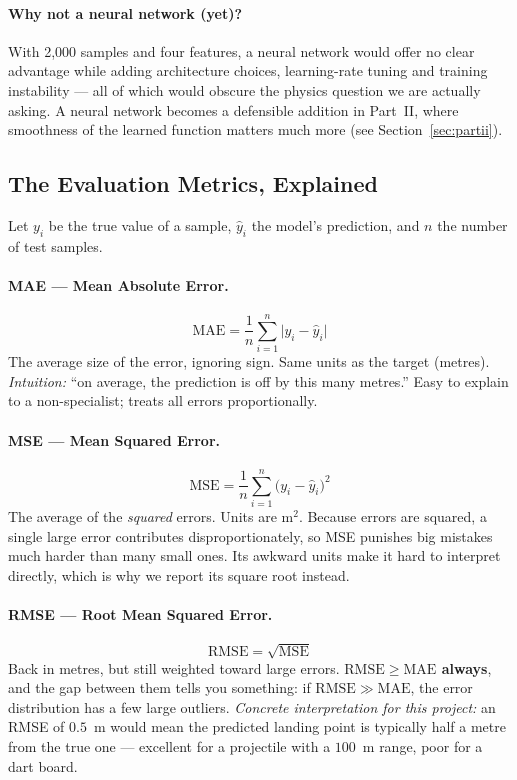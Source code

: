 \documentclass[11pt,a4paper]{article}
\begin{document}
\paragraph{Why not a neural network (yet)?}
With 2{,}000 samples and four features, a neural network would offer no clear advantage while
adding architecture choices, learning-rate tuning and training instability --- all of which would
obscure the physics question we are actually asking. A neural network becomes a defensible addition
in Part~II, where smoothness of the learned function matters much more (see
Section~\ref{sec:partii}).

\subsection{The Evaluation Metrics, Explained}\label{sec:metrics}

Let $y_{i}$ be the true value of a sample, $\hat{y}_{i}$ the model's prediction, and $n$ the number
of test samples.

\paragraph{MAE --- Mean Absolute Error.}
\begin{equation}
  \mathrm{MAE}=\frac{1}{n}\sum_{i=1}^{n}\bigl|y_{i}-\hat{y}_{i}\bigr|
\end{equation}
The average size of the error, ignoring sign. Same units as the target (metres).
\emph{Intuition:} ``on average, the prediction is off by this many metres.'' Easy to explain to a
non-specialist; treats all errors proportionally.

\paragraph{MSE --- Mean Squared Error.}
\begin{equation}
  \mathrm{MSE}=\frac{1}{n}\sum_{i=1}^{n}\bigl(y_{i}-\hat{y}_{i}\bigr)^{2}
\end{equation}
The average of the \emph{squared} errors. Units are $\mathrm{m}^{2}$. Because errors are squared, a
single large error contributes disproportionately, so MSE punishes big mistakes much harder than
many small ones. Its awkward units make it hard to interpret directly, which is why we report its
square root instead.

\paragraph{RMSE --- Root Mean Squared Error.}
\begin{equation}
  \mathrm{RMSE}=\sqrt{\mathrm{MSE}}
\end{equation}
Back in metres, but still weighted toward large errors. \textbf{$\mathrm{RMSE}\geq\mathrm{MAE}$
always}, and the gap between them tells you something: if $\mathrm{RMSE}\gg\mathrm{MAE}$, the error
distribution has a few large outliers. \emph{Concrete interpretation for this project:} an RMSE of
$0.5$~m would mean the predicted landing point is typically half a metre from the true one ---
excellent for a projectile with a $100$~m range, poor for a dart board.
\end{document}
